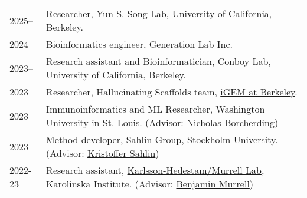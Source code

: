 
\begin{longtable}[l]{@{}p{} p{}}

    2025-- & Researcher, Yun S. Song Lab, University of California, Berkeley. \\

    2024 & Bioinformatics engineer, Generation Lab Inc. \\

    2023-- & Research assistant and Bioinformatician, Conboy Lab, University of California, Berkeley. \\

    2023 & Researcher, Hallucinating Scaffolds team, \href{https://igem.studentorg.berkeley.edu/teams/hallucinating-scaffolds/}{iGEM at Berkeley}. \\

    2023-- & Immunoinformatics and ML Researcher, Washington University in St. Louis. (Advisor: \href{https://www.borch.dev/}{Nicholas Borcherding}) \\

    2023 & Method developer, Sahlin Group, Stockholm University. (Advisor: \href{https://www.scilifelab.se/researchers/kristoffer-sahlin/}{Kristoffer Sahlin}) \\

    2022-23 & Research assistant, \href{https://ki.se/en/people/benjamin-murrell}{Karlsson-Hedestam/Murrell Lab}, Karolinska Institute. (Advisor: \href{https://ki.se/en/people/benjamin-murrell}{Benjamin Murrell}) \\

\end{longtable}
